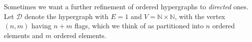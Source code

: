 \documentclass{article}
\newtheorem{lem}[thm]{Lemma}
\newtheorem{cor}[thm]{Corollary}
\theoremstyle{definition}
\theoremstyle{remark}
\let\setof\Set
\def\Set{\mathbf{Set}}
\newcounter{nodemaker}
\newcommand{\twocell}[2][]{%
  \global\edef\mynodeone{twocell\arabic{nodemaker}}%
  \stepcounter{nodemaker}%
  \global\edef\mynodetwo{twocell\arabic{nodemaker}}%
  \stepcounter{nodemaker}%
  \ar[#2,phantom,shift left=3,""{name=\mynodeone}]%
  \ar[#2,phantom,shift right=3,""'{name=\mynodetwo}]%
  \ar[Rightarrow,from=\mynodeone,to=\mynodetwo,"{#1}"]%
}
\let\ot\leftarrow
\let\xto\xrightarrow
\def\N{\mathbb{N}}
\def\Np{\N_{\bullet}}
\def\hy{\mathbf{HyGph}}
\def\RGph{\mathbf{RGph}}
\def\thy{\mathcal{O}}
\def\dhy{\mathcal{D}}
\begin{document}
\begin{comment}
Ordered hypergraphs have another convenient description.
Let $\Np$ be the set $\setof{(k,n) \in \N\times \N | k<n}$, with $\ell:\Np\to \N$ the second projection.
Thus the fiber of $\ell$ over $n\in\N$ is the canonical $n$-element linear order, and we can write $\thy = (\N \ot \Np \to 1)$.

Let $P_\ell$ be the polynomial endofunctor of $\Set$ defined by $\ell$, i.e.\ the composite
\[ \Set \xto{(\Np)^*} \Set/\Np \xto{\Pi_\ell} \Set/\N \xto{\Sigma_\N} \Set.\]
Thus an element of $P_\ell(E)$ is a finite list of elements of $E$.

Let $\RGph$ denote the category of reflexive directed graphs, with $U:\RGph\to\Set$ the functor taking the underlying set of vertices.

\begin{lem}
  The category $\hy/\thy$ of ordered hypergraphs is equivalent to the comma category
  \[
  \begin{tikzcd}
    \hy \ar[rr] \ar[d] \twocell{drr} && \Set \ar[d,equals] \\
    \RGph \ar[r,"U"'] & \Set \ar[r,"P_\ell"'] & \Set.
  \end{tikzcd}
  \]
\end{lem}
\begin{proof}
  An object of the comma category consists of a reflexive graph $E$ together with a set $V$ and a map $V \to P_\ell U E$.
  By definition of $P_\ell$, the latter map is equivalent to a map $f:V\to \N$ together with a map $f^*\Np \to UE$.
  This is exactly the data of a hypergraph $V \ot f^*\Np \to E$ equipped with a hypergraph map to $\thy = (\N \ot\Np \to 1)$.
\end{proof}

\begin{cor}
  $\hy/\thy$ is a presheaf topos.
  In particular, it is complete and cocomplete.
\end{cor}
\begin{proof}
  The functor $P_\ell \circ U : \RGph \to \Set$ is a parametric right adjoint, since $P_\ell$ is a polynomial functor and $U$ is a right adjoint.
  Thus, since $\RGph$ is a presheaf topos, by~\cite{cj:clfrag} $\hy/\thy$ is again a presheaf topos.
\end{proof}
\end{comment}

Sometimes we want a further refinement of ordered hypergraphs to \emph{directed} ones.
Let $\dhy$ denote the hypergraph with $E=1$ and $V=\N\times \N$, with the vertex $(n,m)$ having $n+m$ flags, which we think of as partitioned into $n$ ordered elements and $m$ ordered elements.
\end{document}
